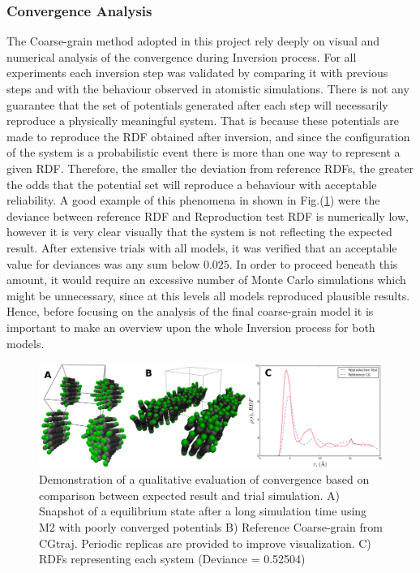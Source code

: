 \documentclass[10pt,a4paper,twoside]{article}
\begin{document}
\subsubsection{Convergence Analysis}
The Coarse-grain method adopted in this project rely deeply on visual and numerical analysis of the convergence during Inversion process. For all experiments each inversion step was validated by comparing it with previous steps and with the behaviour observed in atomistic simulations. There is not any guarantee that the set of potentials generated after each step will necessarily reproduce a physically meaningful system.  That is because these potentials are made to reproduce the RDF obtained after inversion, and since the configuration of the system is a probabilistic event there is more than one way to represent a given RDF. Therefore, the smaller the deviation from reference RDFs, the greater the odds that the potential set will reproduce a behaviour with acceptable reliability. A good example of this phenomena in shown in Fig.(\ref{Fig:wrong}) were the deviance between reference RDF and Reproduction test RDF is numerically low, however it is very clear visually that the system is not reflecting the expected result. After extensive trials  with all models, it was verified that an acceptable value for deviances was any sum below $0.025$. In order to proceed beneath this amount, it would require an excessive number of Monte Carlo simulations which might be unnecessary, since at this levels all models reproduced plausible results. Hence, before focusing on the analysis of the final coarse-grain model it is important to make an overview upon the whole Inversion process for both models.

\begin{figure}[ht!]
  \begin{center}
	\includegraphics[width=1 \textwidth]{./images/wrongM2}
	\caption{Demonstration of a qualitative evaluation of convergence based on comparison between expected result and trial simulation. A) Snapshot of a equilibrium state after a long simulation time using M2 with poorly converged potentials B) Reference Coarse-grain from CGtraj. Periodic replicas are provided to improve visualization. C) RDFs representing each system (Deviance  = 0.52504)}
	\label{Fig:wrong}
  \end{center}
\end{figure}
\end{document}
